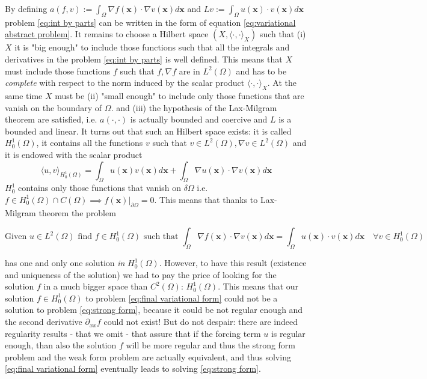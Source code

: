 By defining $a(f, v):=	\int_\Omega \nabla f(\mathbf x)\cdot\nabla v(\mathbf x) d\mathbf x $ and $Lv := \int_\Omega  u(\mathbf x)\cdot v(\mathbf x)d\mathbf x$ problem \ref{eq:int by parts} can be written in the form of equation \ref{eq:variational abstract problem}. It remains to choose a Hilbert space $(X, \langle\cdot,\cdot\rangle_X)$ such that (i) $X$ it is "big enough" to include those functions such that all the integrals and derivatives in the problem \ref{eq:int by parts} is well defined. This means that $X$ must include those functions $f$ such that $f, \nabla f$ are in $L^2(\Omega)$ and has to be \textit{complete} with respect to the norm induced by the scalar product $\langle\cdot,\cdot\rangle_X$. At the same time $X$ must be (ii) "small enough" to include only those functions that are vanish on the boundary of $\Omega$. and (iii) the hypothesis of the Lax-Milgram theorem are satisfied, i.e. $a(\cdot, \cdot)$ is actually bounded and coercive and $L$ is a bounded and linear. It turns out that such an Hilbert space exists: it is called $H^1_0(\Omega)$, it contains all the functions $v$ such that $v\in L^2(\Omega), \nabla v\in L^2(\Omega)$ and it is endowed with the scalar product 
$$
\langle u, v\rangle_{H^1_0(\Omega)} = \int_\Omega u(\mathbf x)v(\mathbf x)d\mathbf x + \int_\Omega\nabla u(\mathbf x)\cdot \nabla v(\mathbf x) d\mathbf x
$$
$H^1_0$ contains only those functions that vanish on $\delta \Omega$ i.e. $f\in H^1_0(\Omega)\cap C(\Omega) \implies \left.f(\mathbf x)\right|_{\partial\Omega}=0$. This means that thanks to Lax-Milgram theorem the problem

\begin{equation}\label{eq:final variational form}
	\text{Given }u\in L^2(\Omega)\text{ find }f\in H^1_0(\Omega)\text{ such that }\int_\Omega \nabla f(\mathbf x)\cdot\nabla v(\mathbf x) d\mathbf x = \int_\Omega  u(\mathbf x)\cdot v(\mathbf x)d\mathbf x\quad \forall v\in H^1_0(\Omega)
\end{equation}

has one and only one solution \textit{in} $H^1_0(\Omega)$. However, to have this result (existence and uniqueness of the solution) we had to pay the price of looking for the solution $f$ in a much bigger space than $C^2(\Omega)$: $H^1_0(\Omega)$. This means that our solution $f\in H^1_0(\Omega)$ to problem \ref{eq:final variational form} could not be a solution to problem \ref{eq:strong form}, because it could be not regular enough and the second derivative $\partial_{xx}f$ could not exist! But do not despair: there are indeed regularity results - that we omit - that assure that if the forcing term $u$ is regular enough, than also the solution $f$ will be more regular and thus the strong form problem and the weak form problem are actually equivalent, and thus solving \ref{eq:final variational form} eventually leads to solving \ref{eq:strong form}.

